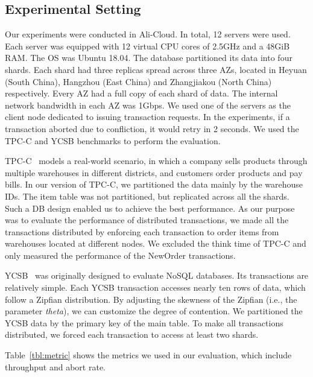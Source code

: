 \documentclass[conference]{IEEEtran}
\begin{document}
\subsection{Experimental Setting}
\label{subsec:exp_setting}

Our experiments were conducted in Ali-Cloud.
In total, 12 servers were used.
Each server was equipped with 12 virtual CPU cores of 2.5GHz and a 48GiB RAM.
The OS was Ubuntu 18.04.
The database partitioned its data into four shards.
Each shard had three replicas spread across three AZs,
located in Heyuan (South China), Hangzhou (East China) and Zhangjiakou (North China) respectively.
Every AZ had a full copy of each shard of data.
The internal network bandwidth in each AZ was 1Gbps.
We used one of the servers as the client node dedicated to issuing transaction requests.
In the experiments, if a transaction aborted due to confliction, it would retry in 2 seconds.
We used the TPC-C and YCSB benchmarks to perform the evaluation.


TPC-C~\cite{TPCC:conf/tpctc/NambiarWMTLCM11} models a real-world scenario, in which a company sells products through multiple warehouses in different districts, and customers order products and pay bills.
In our version of TPC-C, we partitioned the data mainly by the warehouse IDs.
The item table was not partitioned, but replicated across all the shards.
Such a DB design enabled us to achieve the best performance.
As our purpose was to evaluate the performance of distributed transactions,
we made all the transactions distributed by enforcing each transaction to order items from warehouses located at different nodes.
We excluded the think time of TPC-C and only measured the performance of the NewOrder transactions.


YCSB~\cite{YCSB:conf/cloud/CooperSTRS10} was originally designed to evaluate NoSQL databases.
Its transactions are relatively simple.
Each YCSB transaction accesses nearly ten rows of data, which follow a Zipfian distribution.
By adjusting the skewness of the Zipfian (i.e., the parameter \emph{theta}), we can customize the degree of contention.
We partitioned the YCSB data by the primary key of the main table.
To make all transactions distributed, we forced each transaction to access at least two shards.

Table~\ref{tbl:metric} shows the metrics we used in our evaluation, which include throughput and abort rate.
\end{document}
